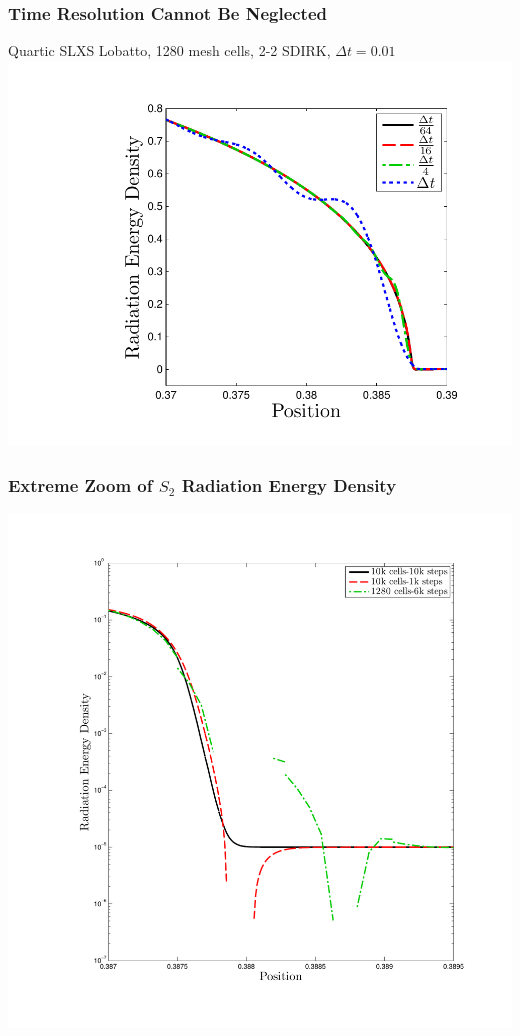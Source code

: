 \documentclass{beamer}
\begin{document}
\begin{frame}
\frametitle{Time Resolution Cannot Be Neglected}
\centering
Quartic SLXS Lobatto, 1280 mesh cells, 2-2 SDIRK, $\Delta t = 0.01$
\\
\vspace{0.1in}
\includegraphics[width=0.9\textheight,trim=1.0in  0.2in 0.5in 0.5in,clip=true]{../chapter6_grey_radtran/Dissertation_Data/Time_Refinement_Zoom_Radiation.pdf}
\end{frame}


\begin{frame}
\frametitle{Extreme Zoom of $S_2$ Radiation Energy Density}
\centering
\includegraphics[height=0.8\textheight,trim=1.0in  0.75in 1.0in 1.0in,clip=true]{../chapter6_grey_radtran/Dissertation_Data/Zoom_10k_Phi.pdf}
\end{frame}
\end{document}
